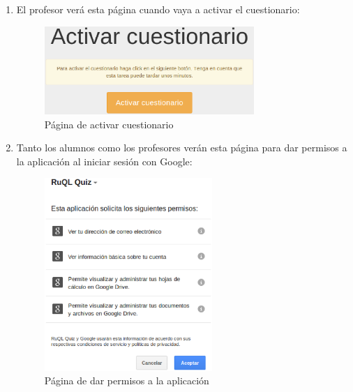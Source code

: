 \begin{enumerate}
  
  \item El profesor ver\'a esta p\'agina cuando vaya a activar el cuestionario:
  \begin{figure}[!th]
  \begin{center}
  \includegraphics[width=0.75\textwidth]{images/app4.eps}
  \caption{P\'agina de activar cuestionario}
  \label{fig:app4}
  \end{center}
  \end{figure}
  \newpage
  
  \item Tanto los alumnos como los profesores ver\'an esta p\'agina para dar permisos a la aplicaci\'on al iniciar sesi\'on con Google:
  \begin{figure}[!th]
  \begin{center}
  \includegraphics[width=0.6\textwidth]{images/app5.eps}
  \caption{P\'agina de dar permisos a la aplicaci\'on}
  \label{fig:app5}
  \end{center}
  \end{figure}
  

\end{enumerate}
